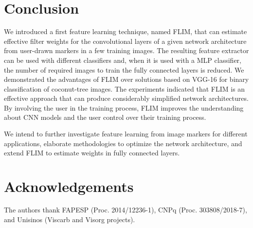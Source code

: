 \documentclass[a4paper,conference]{IEEEtran}
\begin{document}
\section{Conclusion}

We introduced a first feature learning technique, named FLIM, that can estimate effective filter weights for the convolutional layers of a given network architecture from user-drawn markers in a few training images. The resulting feature extractor can be used with different classifiers and, when it is used with a MLP classifier, the number of required images to train the fully connected layers is reduced. We demonstrated the advantages of FLIM over solutions based on VGG-16 for binary classification of coconut-tree images. The experiments indicated that FLIM is an effective approach that can produce considerably simplified network architectures. By involving the user in the training process, FLIM improves the understanding about CNN models and the user control over their training process. 

We intend to further investigate feature learning from image markers for different applications, elaborate methodologies to optimize the network architecture, and extend FLIM to estimate weights in fully connected layers.   

\section*{Acknowledgements}

The authors thank FAPESP (Proc. 2014/12236-1), CNPq (Proc. 303808/2018-7), and Unisinos (Viscarb and Visorg projects). 


\end{document}
